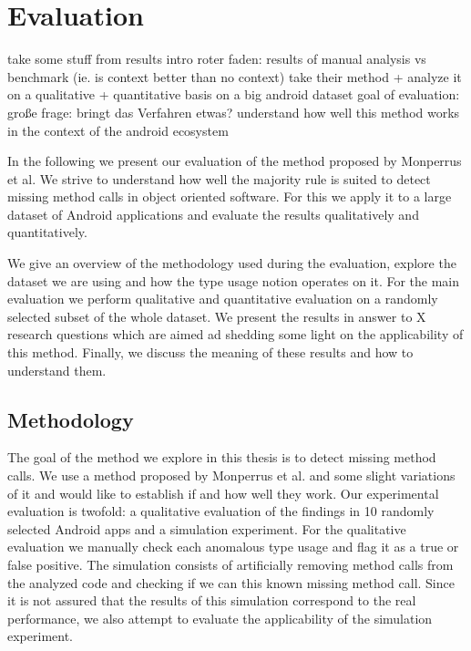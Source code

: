 \chapter{Evaluation}\label{ch:eval}

take some stuff from results intro
roter faden: results of manual analysis vs benchmark (ie. is context better than no context)
take their method + analyze it on a qualitative + quantitative basis on a big android dataset
goal of evaluation:
große frage: bringt das Verfahren etwas?
understand how well this method works in the context of the android ecosystem

In the following we present our evaluation of the method proposed by Monperrus et al.
We strive to understand how well the majority rule is suited to detect missing method calls in object oriented software.
For this we apply it to a large dataset of Android applications and evaluate the results qualitatively and quantitatively. 

We give an overview of the methodology used during the evaluation, explore the dataset we are using and how the type usage notion operates on it.
For the main evaluation we perform qualitative and quantitative evaluation on a randomly selected subset of the whole dataset.
We present the results in answer to X research questions which are aimed ad shedding some light on the applicability of this method.
Finally, we discuss the meaning of these results and how to understand them.

\section{Methodology}

The goal of the method we explore in this thesis is to detect missing method calls.
We use a method proposed by Monperrus et al. and some slight variations of it and would like to establish if and how well they work.
Our experimental evaluation is twofold: a qualitative evaluation of the findings in 10 randomly selected Android apps and a simulation experiment.
For the qualitative evaluation we manually check each anomalous type usage and flag it as a true or false positive.
The simulation consists of artificially removing method calls from the analyzed code and checking if we can this known missing method call.
Since it is not assured that the results of this simulation correspond to the real performance, we also attempt to evaluate the applicability of the simulation experiment.

